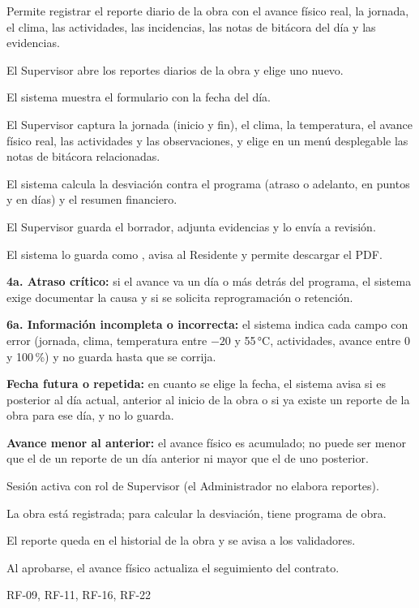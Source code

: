 {Permite registrar el reporte diario de la obra con el avance físico real, la jornada, el clima, las actividades, las incidencias, las notas de bitácora del día y las evidencias.}
{\item El Supervisor abre los reportes diarios de la obra y elige uno nuevo.
 \item El sistema muestra el formulario con la fecha del día.
 \item El Supervisor captura la jornada (inicio y fin), el clima, la temperatura, el avance físico real, las actividades y las observaciones, y elige en un menú desplegable las notas de bitácora relacionadas.
 \item El sistema calcula la desviación contra el programa (atraso o adelanto, en puntos y en días) y el resumen financiero.
 \item El Supervisor guarda el borrador, adjunta evidencias y lo envía a revisión.
 \item El sistema lo guarda como , avisa al Residente y permite descargar el PDF.}
{\item \textbf{4a. Atraso crítico:} si el avance va un día o más detrás del programa, el sistema exige documentar la causa y si se solicita reprogramación o retención.
 \item \textbf{6a. Información incompleta o incorrecta:} el sistema indica cada campo con error (jornada, clima, temperatura entre $-20$ y 55\,°C, actividades, avance entre 0 y 100\,\%) y no guarda hasta que se corrija.
 \item \textbf{Fecha futura o repetida:} en cuanto se elige la fecha, el sistema avisa si es posterior al día actual, anterior al inicio de la obra o si ya existe un reporte de la obra para ese día, y no lo guarda.
 \item \textbf{Avance menor al anterior:} el avance físico es acumulado; no puede ser menor que el de un reporte de un día anterior ni mayor que el de uno posterior.}
{\item Sesión activa con rol de Supervisor (el Administrador no elabora reportes).
 \item La obra está registrada; para calcular la desviación, tiene programa de obra.}
{\item El reporte queda en el historial de la obra y se avisa a los validadores.
 \item Al aprobarse, el avance físico actualiza el seguimiento del contrato.}
{RF-09, RF-11, RF-16, RF-22}

